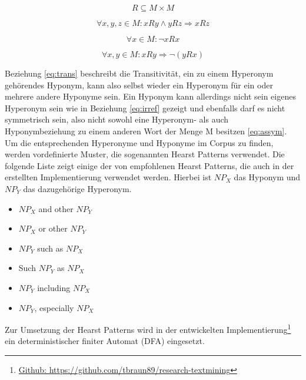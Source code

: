 \begin{equation}
  \label{eq:relation}
  R \subseteq M \times M
\end{equation}

\begin{equation}
  \label{eq:trans}
  \forall x, y, z \in M : xRy \land yRz \Rightarrow xRz
\end{equation}

\begin{equation}
  \label{eq:irref}
  \forall x \in M : \neg xRx
\end{equation}

\begin{equation}
  \label{eq:assym}
  \forall x, y \in M : xRy \Rightarrow \neg (yRx)
\end{equation}

Beziehung \ref{eq:trans} beschreibt die Transitivität, ein zu einem Hyperonym gehörendes Hyponym, 
kann also selbst wieder ein Hyperonym für ein oder mehrere andere Hyponyme sein.
Ein Hyponym kann allerdings nicht sein eigenes Hyperonym sein wie in Beziehung \ref{eq:irref} gezeigt und ebenfalls darf es
nicht symmetrisch sein, also nicht sowohl eine Hyperonym- als auch Hyponymbeziehung zu einem anderen Wort
der Menge M besitzen \ref{eq:assym}.
Um die entsprechenden Hyperonyme und Hyponyme im Corpus zu finden, werden vordefinierte Muster, die sogenannten Hearst Patterns
verwendet. Die folgende Liste zeigt einige der von  empfohlenen Hearst Patterns, die auch in der erstellten
Implementierung verwendet werden. Hierbei ist $NP_{X}$ das Hyponym und $NP_{Y}$ das dazugehörige Hyperonym. \cite{bib:Snow2004}

\begin{itemize}
\item $NP_{X}$ and other $NP_{Y}$
\item $NP_{X}$ or other $NP_{Y}$
\item $NP_{Y}$ such as $NP_{X}$
\item Such $NP_{Y}$ as $NP_{X}$
\item $NP_{Y}$ including $NP_{X}$
\item $NP_{Y}$, especially $NP_{X}$
\end{itemize}

Zur Umsetzung der Hearst Patterns wird in der entwickelten Implementierung\footnote{\href{https://github.com/tbraun89/research-textmining}{Github:
 https://github.com/tbraun89/research-textmining}} ein deterministischer finiter Automat (DFA) eingesetzt. 
